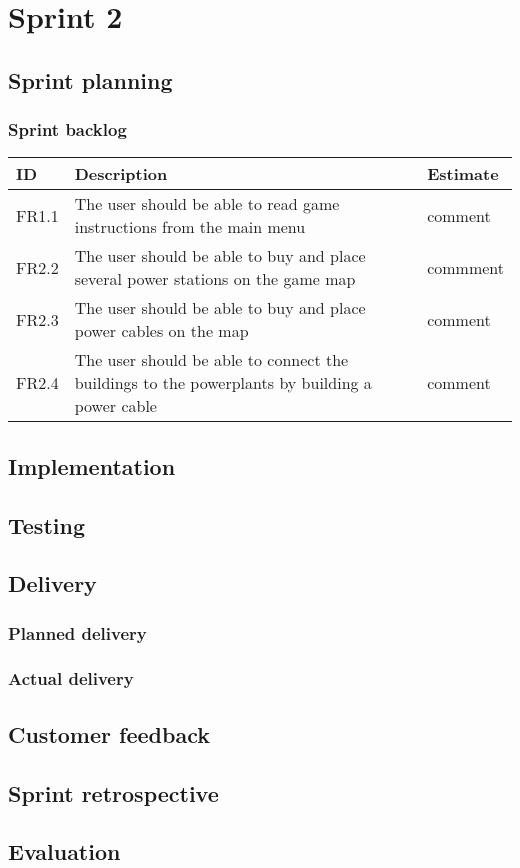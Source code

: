 \section{Sprint 2}

\subsection{Sprint planning}
\subsubsection{Sprint backlog}
\begin{tabular}{| p{1cm} | p{8cm} | p{3cm} |}
	\hline
	\rowcolor{gray}
	ID & Description & Estimate \\ \hline
	FR1.1 & The user should be able to read game instructions from the main menu & comment \\ \hline
	FR2.2 & The user should be able to buy and place several power stations on the game map 
	& commment \\ \hline
	FR2.3 & The user should be able to buy and place power cables on the map & comment \\ \hline
	FR2.4 & The user should be able to connect the buildings to the powerplants by 
	building a power cable & comment \\ \hline
\end{tabular}
\subsection{Implementation}


\subsection{Testing}
\subsection{Delivery}
\subsubsection{Planned delivery}
\subsubsection{Actual delivery}
\subsection{Customer feedback}
\subsection{Sprint retrospective}
\subsection{Evaluation}